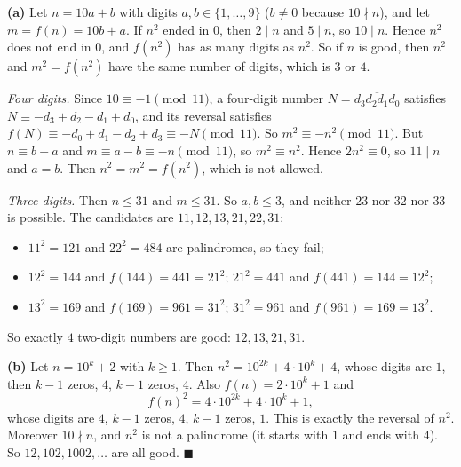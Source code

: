 \textbf{(a)} Let $n=10a+b$ with digits $a,b\in\{1,\dots,9\}$ ($b\ne0$ because $10\nmid n$), and let $m=f(n)=10b+a$. If $n^2$ ended in $0$, then $2\mid n$ and $5\mid n$, so $10\mid n$. Hence $n^2$ does not end in $0$, and $f\left(n^2\right)$ has as many digits as $n^2$. So if $n$ is good, then $n^2$ and $m^2=f\left(n^2\right)$ have the same number of digits, which is $3$ or $4$.

\emph{Four digits.} Since $10\equiv-1\pmod{11}$, a four-digit number $N=\overline{d_3d_2d_1d_0}$ satisfies $N\equiv-d_3+d_2-d_1+d_0$, and its reversal satisfies $f(N)\equiv-d_0+d_1-d_2+d_3\equiv-N\pmod{11}$. So $m^2\equiv-n^2\pmod{11}$. But $n\equiv b-a$ and $m\equiv a-b\equiv-n\pmod{11}$, so $m^2\equiv n^2$. Hence $2n^2\equiv0$, so $11\mid n$ and $a=b$. Then $n^2=m^2=f\left(n^2\right)$, which is not allowed.

\emph{Three digits.} Then $n\le31$ and $m\le31$. So $a,b\le3$, and neither $23$ nor $32$ nor $33$ is possible. The candidates are $11,12,13,21,22,31$:
\begin{itemize}
\item $11^2=121$ and $22^2=484$ are palindromes, so they fail;
\item $12^2=144$ and $f(144)=441=21^2$; \quad $21^2=441$ and $f(441)=144=12^2$;
\item $13^2=169$ and $f(169)=961=31^2$; \quad $31^2=961$ and $f(961)=169=13^2$.
\end{itemize}
So exactly $\boxed{4}$ two-digit numbers are good: $12,13,21,31$.

\textbf{(b)} Let $n=10^k+2$ with $k\ge1$. Then $n^2=10^{2k}+4\cdot10^k+4$, whose digits are $1$, then $k-1$ zeros, $4$, $k-1$ zeros, $4$. Also $f(n)=2\cdot10^k+1$ and
\[f(n)^2=4\cdot10^{2k}+4\cdot10^k+1,\]
whose digits are $4$, $k-1$ zeros, $4$, $k-1$ zeros, $1$. This is exactly the reversal of $n^2$. Moreover $10\nmid n$, and $n^2$ is not a palindrome (it starts with $1$ and ends with $4$). So $12,102,1002,\dots$ are all good. $\blacksquare$

